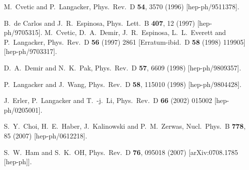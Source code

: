 \documentclass[final,3p,11pt,pdflatex]{elsarticle}
\begin{document}
\begin{thebibliography}{100}
  M.~Cvetic and P.~Langacker,
  Phys.\ Rev.\ D {\bf 54}, 3570 (1996)
  [hep-ph/9511378].


  B.~de Carlos and J.~R.~Espinosa,
  Phys.\ Lett.\ B {\bf 407}, 12 (1997)
  [hep-ph/9705315].
  M.~Cvetic, D.~A.~Demir, J.~R.~Espinosa, L.~L.~Everett and P.~Langacker,
  Phys.\ Rev.\ D {\bf 56} (1997) 2861
   [Erratum-ibid.\ D {\bf 58} (1998) 119905]
  [hep-ph/9703317].

  D.~A.~Demir and N.~K.~Pak,
  Phys.\ Rev.\ D {\bf 57}, 6609 (1998)
  [hep-ph/9809357].

  P.~Langacker and J.~Wang,
  Phys.\ Rev.\ D {\bf 58}, 115010 (1998)
  [hep-ph/9804428].

  J.~Erler, P.~Langacker and T.~-j.~Li,
  Phys.\ Rev.\ D {\bf 66} (2002) 015002
  [hep-ph/0205001].

  S.~Y.~Choi, H.~E.~Haber, J.~Kalinowski and P.~M.~Zerwas,
  Nucl.\ Phys.\ B {\bf 778}, 85 (2007)
  [hep-ph/0612218].

  S.~W.~Ham and S.~K.~OH,
  Phys.\ Rev.\ D {\bf 76}, 095018 (2007)
  [arXiv:0708.1785 [hep-ph]].


\end{thebibliography}
\end{document}
